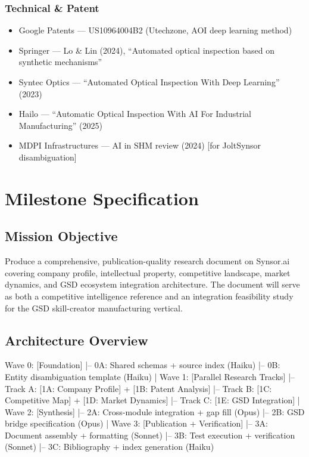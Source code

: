 \documentclass[11pt,letterpaper]{article}
\newcommand{\stageheader}[2]{%
  \noindent\colorbox{#2}{\makebox[\textwidth][l]{%
    \textcolor{white}{\bfseries\sffamily\hspace{6pt}#1\hspace{6pt}}}}%
  \vspace{0.5em}\par%
}
\begin{document}
\subsubsection*{Technical \& Patent}
\begin{itemize}[leftmargin=2em]
  \item Google Patents --- US10964004B2 (Utechzone, AOI deep learning method)
  \item Springer --- Lo \& Lin (2024), ``Automated optical inspection based on synthetic mechanisms''
  \item Syntec Optics --- ``Automated Optical Inspection With Deep Learning'' (2023)
  \item Hailo --- ``Automatic Optical Inspection With AI For Industrial Manufacturing'' (2025)
  \item MDPI Infrastructures --- AI in SHM review (2024) [for JoltSynsor disambiguation]
\end{itemize}

\newpage
\stageheader{STAGE 3 --- MISSION PACKAGE}{tertiary}

\section{Milestone Specification}

\subsection{Mission Objective}

Produce a comprehensive, publication-quality research document on Synsor.ai covering company profile, intellectual property, competitive landscape, market dynamics, and GSD ecosystem integration architecture. The document will serve as both a competitive intelligence reference and an integration feasibility study for the GSD skill-creator manufacturing vertical.

\subsection{Architecture Overview}

\begin{asciibox}
Wave 0: [Foundation]
         |-- 0A: Shared schemas + source index (Haiku)
         |-- 0B: Entity disambiguation template (Haiku)
         |
Wave 1: [Parallel Research Tracks]
         |-- Track A: [1A: Company Profile] + [1B: Patent Analysis]
         |-- Track B: [1C: Competitive Map] + [1D: Market Dynamics]
         |-- Track C: [1E: GSD Integration]
         |
Wave 2: [Synthesis]
         |-- 2A: Cross-module integration + gap fill (Opus)
         |-- 2B: GSD bridge specification (Opus)
         |
Wave 3: [Publication + Verification]
         |-- 3A: Document assembly + formatting (Sonnet)
         |-- 3B: Test execution + verification (Sonnet)
         |-- 3C: Bibliography + index generation (Haiku)
\end{asciibox}
\end{document}
